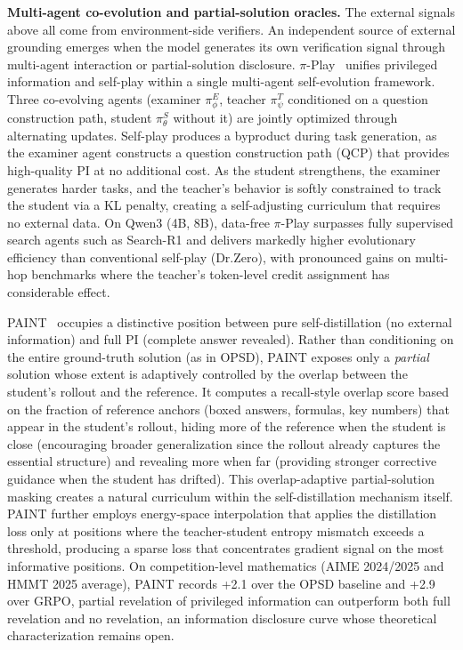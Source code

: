\documentclass{article} %
\begin{document}
\textbf{Multi-agent co-evolution and partial-solution oracles.} The external signals above all come from environment-side verifiers. An independent source of external grounding emerges when the model generates its own verification signal through multi-agent interaction or partial-solution disclosure. $\pi$-Play~\citep{2604.14054} unifies privileged information and self-play within a single multi-agent self-evolution framework. Three co-evolving agents (examiner $\pi^E_\phi$, teacher $\pi^T_\psi$ conditioned on a question construction path, student $\pi^S_\theta$ without it) are jointly optimized through alternating updates. Self-play produces a byproduct during task generation, as the examiner agent constructs a question construction path (QCP) that provides high-quality PI at no additional cost. As the student strengthens, the examiner generates harder tasks, and the teacher's behavior is softly constrained to track the student via a KL penalty, creating a self-adjusting curriculum that requires no external data. On Qwen3 (4B, 8B), data-free $\pi$-Play surpasses fully supervised search agents such as Search-R1 and delivers markedly higher evolutionary efficiency than conventional self-play (Dr.Zero), with pronounced gains on multi-hop benchmarks where the teacher's token-level credit assignment has considerable effect.

PAINT~\citep{2604.26573} occupies a distinctive position between pure self-distillation (no external information) and full PI (complete answer revealed). Rather than conditioning on the entire ground-truth solution (as in OPSD), PAINT exposes only a \emph{partial} solution whose extent is adaptively controlled by the overlap between the student's rollout and the reference. It computes a recall-style overlap score based on the fraction of reference anchors (boxed answers, formulas, key numbers) that appear in the student's rollout, hiding more of the reference when the student is close (encouraging broader generalization since the rollout already captures the essential structure) and revealing more when far (providing stronger corrective guidance when the student has drifted). This overlap-adaptive partial-solution masking creates a natural curriculum within the self-distillation mechanism itself. PAINT further employs energy-space interpolation that applies the distillation loss only at positions where the teacher-student entropy mismatch exceeds a threshold, producing a sparse loss that concentrates gradient signal on the most informative positions. On competition-level mathematics (AIME 2024/2025 and HMMT 2025 average), PAINT records +2.1 over the OPSD baseline and +2.9 over GRPO, partial revelation of privileged information can outperform both full revelation and no revelation, an information disclosure curve whose theoretical characterization remains open.
\end{document}
